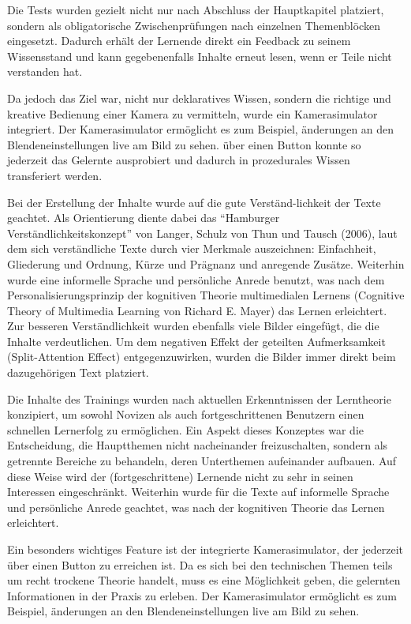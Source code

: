 \documentclass{article}
\begin{document}
Die Tests wurden gezielt nicht nur nach Abschluss der Hauptkapitel platziert, sondern als obligatorische Zwischenpr\"ufungen nach einzelnen Themenbl\"ocken eingesetzt. Dadurch erh\"alt der Lernende direkt ein Feedback zu seinem Wissensstand und kann gegebenenfalls Inhalte erneut lesen, wenn er Teile nicht verstanden hat.

Da jedoch das Ziel war, nicht nur deklaratives Wissen, sondern die richtige und kreative Bedienung einer Kamera zu vermitteln, wurde ein Kamerasimulator integriert. Der Kamerasimulator erm\"oglicht es zum Beispiel, \"anderungen an den Blendeneinstellungen live am Bild zu sehen. \"uber einen Button konnte so jederzeit das Gelernte ausprobiert und dadurch in prozedurales Wissen transferiert werden. 

Bei der Erstellung der Inhalte wurde auf die gute Verst\"and-lichkeit der Texte geachtet. Als Orientierung diente dabei das ``Hamburger Verst\"andlichkeitskonzept'' von Langer, Schulz von Thun und Tausch (2006)\cite{rey2009e-learning}, laut dem sich verst\"andliche Texte durch vier Merkmale auszeichnen: Einfachheit, Gliederung und Ordnung, K\"urze und Pr\"agnanz und anregende Zus\"atze. Weiterhin wurde eine informelle Sprache und pers\"onliche Anrede benutzt, was nach dem Personalisierungsprinzip der kognitiven Theorie multimedialen Lernens (Cognitive Theory of Multimedia Learning von Richard E. Mayer)\cite{rey2009e-learning} das Lernen erleichtert. 
Zur besseren Verst\"andlichkeit wurden ebenfalls viele Bilder eingef\"ugt, die die Inhalte verdeutlichen. Um dem negativen Effekt der geteilten Aufmerksamkeit (Split-Attention Effect)\cite{rey2009e-learning} entgegenzuwirken, wurden die Bilder immer direkt beim dazugeh\"origen Text platziert. 


Die Inhalte des Trainings wurden nach aktuellen Erkenntnissen der Lerntheorie konzipiert, um sowohl Novizen als auch fortgeschrittenen Benutzern einen schnellen Lernerfolg zu erm\"oglichen.
Ein Aspekt dieses Konzeptes war die Entscheidung, die Hauptthemen nicht nacheinander freizuschalten, sondern als getrennte Bereiche zu behandeln, deren Unterthemen aufeinander aufbauen. Auf diese Weise wird der (fortgeschrittene) Lernende nicht zu sehr in seinen Interessen eingeschr\"ankt.
Weiterhin wurde f\"ur die Texte auf informelle Sprache und pers\"onliche Anrede geachtet, was nach der kognitiven Theorie das Lernen erleichtert.

Ein besonders wichtiges Feature ist der integrierte Kamerasimulator, der jederzeit \"uber einen Button zu erreichen ist. Da es sich bei den technischen Themen teils um recht trockene Theorie handelt, muss es eine M\"oglichkeit geben, die gelernten Informationen in der Praxis zu erleben. Der Kamerasimulator erm\"oglicht es zum Beispiel, \"anderungen an den Blendeneinstellungen live am Bild zu sehen.
\end{document}
